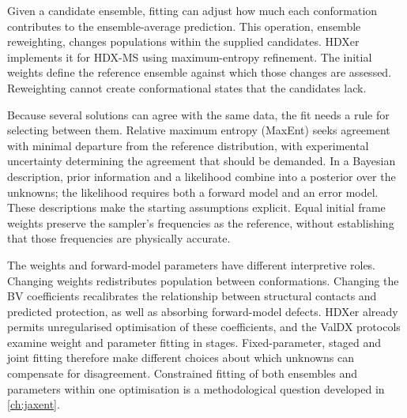 Given a candidate ensemble, fitting can adjust how much each conformation contributes to the ensemble-average prediction. This operation, ensemble reweighting, changes populations within the supplied candidates. HDXer implements it for HDX-MS using maximum-entropy refinement.\supercite{leeInterpretingHydrogenDeuteriumExchange2021} The initial weights define the reference ensemble against which those changes are assessed. Reweighting cannot create conformational states that the candidates lack.

Because several solutions can agree with the same data, the fit needs a rule for selecting between them. Relative maximum entropy (MaxEnt) seeks agreement with minimal departure from the reference distribution, with experimental uncertainty determining the agreement that should be demanded.\supercite{cesariUsingMaximumEntropy2018} In a Bayesian description, prior information and a likelihood combine into a posterior over the unknowns; the likelihood requires both a forward model and an error model.\supercite{bmsb2012ch12} These descriptions make the starting assumptions explicit. Equal initial frame weights preserve the sampler's frequencies as the reference, without establishing that those frequencies are physically accurate.

The weights and forward-model parameters have different interpretive roles. Changing weights redistributes population between conformations. Changing the BV coefficients recalibrates the relationship between structural contacts and predicted protection, as well as absorbing forward-model defects. HDXer already permits unregularised optimisation of these coefficients,\supercite{bradshawInterpretationHDXData2020} and the ValDX protocols examine weight and parameter fitting in stages.\supercite{siddiquiFrameworkTestingStructural2026} Fixed-parameter, staged and joint fitting therefore make different choices about which unknowns can compensate for disagreement. Constrained fitting of both ensembles and parameters within one optimisation is a methodological question developed in \cref{ch:jaxent}.

